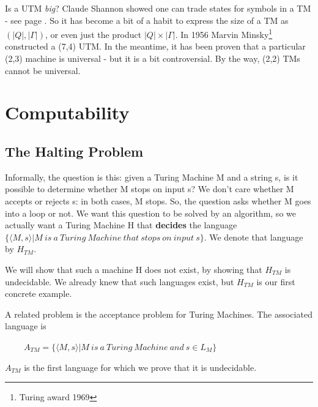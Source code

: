 Is a UTM {\em big}? Claude Shannon showed one can trade states for
symbols in a TM - see page \pageref{twosymbols}. So it
has become a bit of a habit to express the size of a TM as
$(|Q|,|\Gamma|)$, or even just the product $|Q| \times |\Gamma|$. In
1956 Marvin Minsky\footnote{Turing award 1969} constructed a (7,4)
UTM. In the meantime, it has been proven that a particular (2,3)
machine is universal - but it is a bit controversial.  By the way, (2,2) TMs
cannot be universal.

\chapter{Computability}

\section{The Halting Problem}\label{halting}

Informally, the question is this: given a Turing Machine M and a
string s, is it possible to determine whether M stops on input s?
We don't care whether M accepts or rejects s: in both cases, M stops.
So, the question asks whether M goes into a loop or not. We want this
question to be solved by an algorithm, so we actually want a
Turing Machine H that {\bf decides} the language
%
$\{\langle M,s \rangle|
M~is~a~Turing~Machine~that~stops~on~input~s\}$. We denote that
language by $H_{TM}$.


We will show that such a machine H does not exist, by showing that
$H_{TM}$ is undecidable. We already knew that such languages exist, but $H_{TM}$ is our first concrete example.

A related problem is the acceptance problem for Turing Machines. The associated language is

$~~~~~~~~~~A_{TM} = \{\langle M,s \rangle| M~is~a~Turing~Machine~and~s
\in L_{M}\}$

$A_{TM}$ is the first language for which we prove that it is
undecidable.


